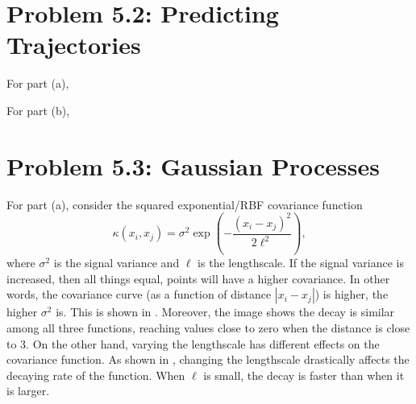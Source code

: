 \documentclass[11pt, english]{article}
\begin{document}
\begin{multicols}{2}
\section*{Problem 5.2: Predicting Trajectories}

For part (a),

For part (b),


\section*{Problem 5.3: Gaussian Processes}

For part (a), consider the squared exponential/RBF covariance function
	$$\kappa(x_{i}, x_{j}) = \sigma^{2}\exp\left(-\frac{(x_{i} - x_{j})^{2}}{2\ell^{2}}\right),$$
where $\sigma^2$ is the signal variance and $\ell$ is the lengthscale. If the signal variance is increased, then all things equal, points will have a higher covariance. In other words, the covariance curve (as a function of distance $|x_{i} - x_{j}|$) is higher, the higher $\sigma^{2}$ is. This is shown in . Moreover, the image shows the decay is similar among all three functions, reaching values close to zero when the distance is close to 3. On the other hand, varying the lengthscale has different effects on the covariance function. As shown in , changing the lengthscale drastically affects the decaying rate of the function. When $\ell$ is small, the decay is faster than when it is larger.


\end{multicols}
\end{document}
